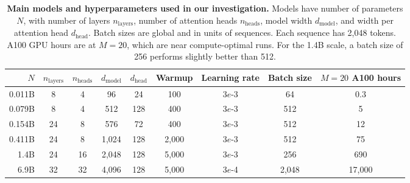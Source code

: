 \begin{table*}[tp]
    \centering
    \small
    \caption{\textbf{Main models and hyperparameters used in our investigation.} Models have number of parameters $N$, with number of layers $n_{\text{layers}}$, number of attention heads $n_{\text{heads}}$, model width $d_{\text{model}}$, and width per attention head $d_{\text{head}}$. Batch sizes are global and in units of sequences. Each sequence has 2,048 tokens.
    A100 GPU hours are at $M=20$, which are near compute-optimal runs.
    For the 1.4B scale, a batch size of 256 performs slightly better than 512.
    }    
    \begin{tabular}{rcccccccc}
        \toprule
        $N$ & $n_{\text{layers}}$ & $n_{\text{heads}}$ & $d_{\text{model}}$ & $d_{\text{head}}$ & Warmup & Learning rate & Batch size & $M=20$ A100 hours\\\midrule
        0.011B & 8 & 4 & 96 & 24 & 100 & 3$e$-3 & 64 & 0.3 \\
        0.079B & 8 & 4 & 512 & 128 & 400 & 3$e$-3 & 512 & 5 \\    
        0.154B & 24 & 8 & 576 & 72 & 400 & 3$e$-3 & 512 & 12 \\     
        0.411B & 24 & 8 & 1,024 & 128 & 2,000 & 3$e$-3 & 512 & 75\\    
        1.4B & 24 & 16 & 2,048 & 128 & 5,000 & 3$e$-3 & 256 & 690\\
        6.9B & 32 & 32 & 4,096 & 128 & 5,000 & 3$e$-4 & 2,048 & 17,000 \\\bottomrule
    \end{tabular}    
    \label{tab:hparams}
\end{table*}